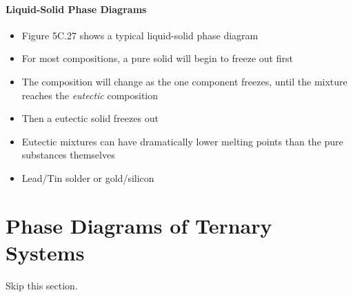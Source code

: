 \documentclass[12pt, openany, letterpaper]{memoir}
\begin{document}
\paragraph{Liquid-Solid Phase Diagrams}
\begin{itemize}
	\item Figure 5C.27 shows a typical liquid-solid phase diagram
	\item For most compositions, a pure solid will begin to freeze out first
	\item The composition will change as the one component freezes, until the mixture reaches the \emph{eutectic} composition
	\item Then a eutectic solid freezes out
	\item Eutectic mixtures can have dramatically lower melting points than the pure substances themselves
	\item Lead/Tin solder or gold/silicon 
\end{itemize}
\section{Phase Diagrams of Ternary Systems}
Skip this section.
\end{document}

